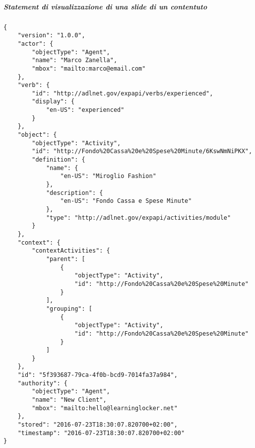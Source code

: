 	\subparagraph*{Statement di visualizzazione di una slide di un contentuto}\hfill \break
	\begin{lstlisting}
{
    "version": "1.0.0",
    "actor": {
        "objectType": "Agent",
        "name": "Marco Zanella",
        "mbox": "mailto:marco@email.com"
    },
    "verb": {
        "id": "http://adlnet.gov/expapi/verbs/experienced",
        "display": {
            "en-US": "experienced"
        }
    },
    "object": {
        "objectType": "Activity",
        "id": "http://Fondo%20Cassa%20e%20Spese%20Minute/6KswNmNiPKX",
        "definition": {
            "name": {
                "en-US": "Miroglio Fashion"
            },
            "description": {
                "en-US": "Fondo Cassa e Spese Minute"
            },
            "type": "http://adlnet.gov/expapi/activities/module"
        }
    },
    "context": {
        "contextActivities": {
            "parent": [
                {
                    "objectType": "Activity",
                    "id": "http://Fondo%20Cassa%20e%20Spese%20Minute"
                }
            ],
            "grouping": [
                {
                    "objectType": "Activity",
                    "id": "http://Fondo%20Cassa%20e%20Spese%20Minute"
                }
            ]
        }
    },
    "id": "5f393687-79ca-4f0b-bcd9-7014fa37a984",
    "authority": {
        "objectType": "Agent",
        "name": "New Client",
        "mbox": "mailto:hello@learninglocker.net"
    },
    "stored": "2016-07-23T18:30:07.820700+02:00",
    "timestamp": "2016-07-23T18:30:07.820700+02:00"
}
	\end{lstlisting}
    
